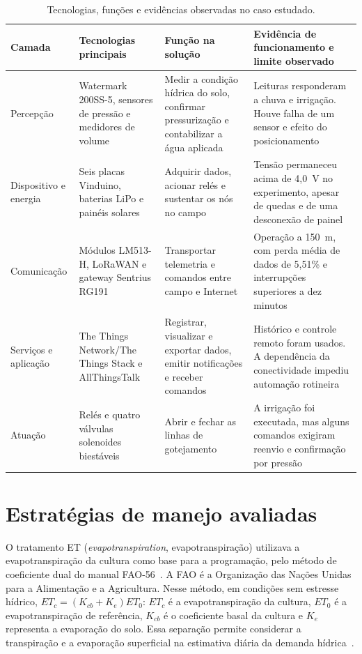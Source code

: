 \documentclass[11pt,a4paper]{article}
\begin{document}
\begin{table}[t]
\centering
\small
\caption{Tecnologias, funções e evidências observadas no caso estudado.}
\label{tab:tecnologias}
\begin{tabularx}{\textwidth}{L{2.25cm}L{4.1cm}YY}
\toprule
Camada & Tecnologias principais & Função na solução & Evidência de funcionamento e limite observado \\
\midrule
Percepção & Watermark 200SS-5, sensores de pressão e medidores de volume & Medir a condição hídrica do solo, confirmar pressurização e contabilizar a água aplicada & Leituras responderam a chuva e irrigação. Houve falha de um sensor e efeito do posicionamento \\
Dispositivo e energia & Seis placas Vinduino, baterias LiPo e painéis solares & Adquirir dados, acionar relés e sustentar os nós no campo & Tensão permaneceu acima de 4,0~V no experimento, apesar de quedas e de uma desconexão de painel \\
Comunicação & Módulos LM513-H, LoRaWAN e gateway Sentrius RG191 & Transportar telemetria e comandos entre campo e Internet & Operação a 150~m, com perda média de dados de 5,51\% e interrupções superiores a dez minutos \\
Serviços e aplicação & The Things Network/The Things Stack e AllThingsTalk & Registrar, visualizar e exportar dados, emitir notificações e receber comandos & Histórico e controle remoto foram usados. A dependência da conectividade impediu automação rotineira \\
Atuação & Relés e quatro válvulas solenoides biestáveis & Abrir e fechar as linhas de gotejamento & A irrigação foi executada, mas alguns comandos exigiram reenvio e confirmação por pressão \\
\bottomrule
\end{tabularx}
\end{table}

\section{Estratégias de manejo avaliadas}
O tratamento ET (\textit{evapotranspiration}, evapotranspiração) utilizava a evapotranspiração da cultura como base para a programação, pelo método de coeficiente dual do manual FAO-56~\cite{zhang2022,allen1998}. A FAO é a Organização das Nações Unidas para a Alimentação e a Agricultura. Nesse método, em condições sem estresse hídrico, $ET_c=(K_{cb}+K_e)ET_0$: $ET_c$ é a evapotranspiração da cultura, $ET_0$ é a evapotranspiração de referência, $K_{cb}$ é o coeficiente basal da cultura e $K_e$ representa a evaporação do solo. Essa separação permite considerar a transpiração e a evaporação superficial na estimativa diária da demanda hídrica~\cite{allen1998}.
\end{document}
